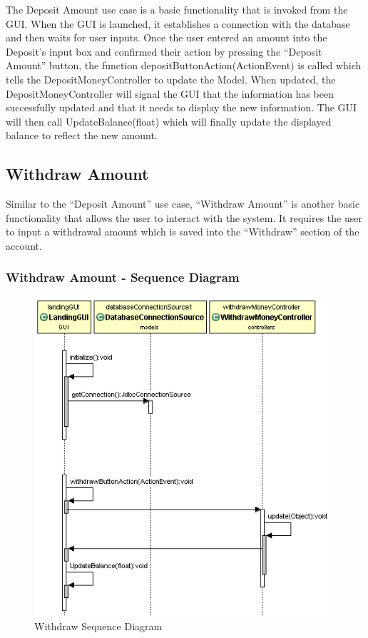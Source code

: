 \documentclass[12pt]{article}
\begin{document}
The Deposit Amount use case is a basic functionality that is invoked from the GUI. When the GUI is launched, it establishes a connection with the database and then waits for user inputs. Once the user entered an amount into the Deposit’s input box and confirmed their action by pressing the “Deposit Amount” button, the function depositButtonAction(ActionEvent) is called which tells the DepositMoneyController to update the Model. When updated, the DepositMoneyController will signal the GUI that the information has been successfully updated and that it needs to display the new information. The GUI will then call UpdateBalance(float) which will finally update the displayed balance to reflect the new amount.


\subsection{Withdraw Amount}
Similar to the “Deposit Amount” use case, “Withdraw Amount” is another basic functionality that allows the user to interact with the system. It requires the user to input a withdrawal amount which is saved into the “Withdraw” section of the account. 

\subsubsection{Withdraw Amount - Sequence Diagram}
\begin{figure}[h!]
  \centering
  \includegraphics[width=110mm]{withdraw_sequence.png}
  \caption{Withdraw Sequence Diagram}
\end{figure}
\clearpage
\end{document}
